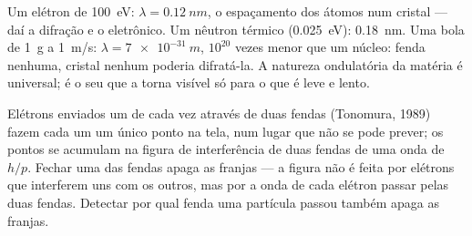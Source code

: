 \begin{example}\label{ex:b1:quantum-introduction:wavelengths}
Um elétron de \qty{100}{eV}: $\lambda = \qty{0.12}{nm}$, o espaçamento dos
átomos num cristal --- daí a difração e o 
eletrônico. Um nêutron térmico (\qty{0.025}{eV}): \qty{0.18}{nm}. Uma bola
de \qty{1}{g} a \qty{1}{m/s}: $\lambda = \qty{7e-31}{m}$, $10^{20}$ vezes
menor que um núcleo: fenda nenhuma, cristal nenhum poderia difratá-la. A
natureza ondulatória da matéria é universal; é o seu  que a torna
visível só para o que é leve e lento.
\end{example}

\begin{proposition}\label{prop:b1:quantum-introduction:buildup}
Elétrons enviados um de cada vez através de duas fendas (Tonomura, 1989)
fazem cada um um único ponto na tela, num lugar que não se pode prever;
os pontos se acumulam na figura de interferência de duas fendas de uma onda
de  $h/p$. Fechar uma das fendas apaga as franjas --- a
figura não é feita por elétrons que interferem uns com os outros, mas por
a onda de cada elétron passar pelas duas fendas. Detectar por qual fenda
uma partícula passou também apaga as franjas.
\end{proposition}
\admitted

